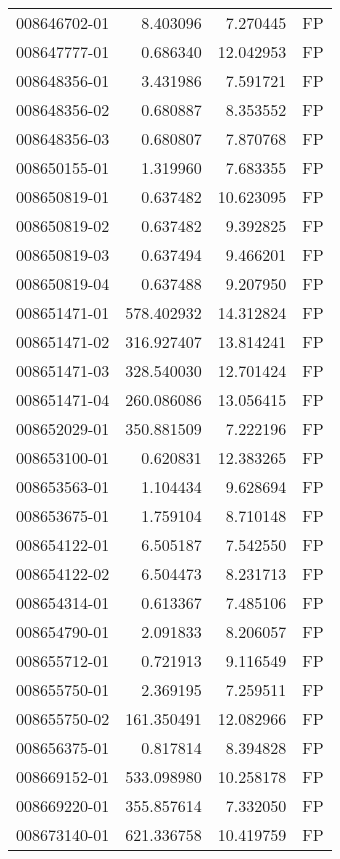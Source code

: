 \begin{tabular}{lrrl}
008646702-01 &    8.403096 &     7.270445 &   FP \\
008647777-01 &    0.686340 &    12.042953 &   FP \\
008648356-01 &    3.431986 &     7.591721 &   FP \\
008648356-02 &    0.680887 &     8.353552 &   FP \\
008648356-03 &    0.680807 &     7.870768 &   FP \\
008650155-01 &    1.319960 &     7.683355 &   FP \\
008650819-01 &    0.637482 &    10.623095 &   FP \\
008650819-02 &    0.637482 &     9.392825 &   FP \\
008650819-03 &    0.637494 &     9.466201 &   FP \\
008650819-04 &    0.637488 &     9.207950 &   FP \\
008651471-01 &  578.402932 &    14.312824 &   FP \\
008651471-02 &  316.927407 &    13.814241 &   FP \\
008651471-03 &  328.540030 &    12.701424 &   FP \\
008651471-04 &  260.086086 &    13.056415 &   FP \\
008652029-01 &  350.881509 &     7.222196 &   FP \\
008653100-01 &    0.620831 &    12.383265 &   FP \\
008653563-01 &    1.104434 &     9.628694 &   FP \\
008653675-01 &    1.759104 &     8.710148 &   FP \\
008654122-01 &    6.505187 &     7.542550 &   FP \\
008654122-02 &    6.504473 &     8.231713 &   FP \\
008654314-01 &    0.613367 &     7.485106 &   FP \\
008654790-01 &    2.091833 &     8.206057 &   FP \\
008655712-01 &    0.721913 &     9.116549 &   FP \\
008655750-01 &    2.369195 &     7.259511 &   FP \\
008655750-02 &  161.350491 &    12.082966 &   FP \\
008656375-01 &    0.817814 &     8.394828 &   FP \\
008669152-01 &  533.098980 &    10.258178 &   FP \\
008669220-01 &  355.857614 &     7.332050 &   FP \\
008673140-01 &  621.336758 &    10.419759 &   FP \\

\end{tabular}
